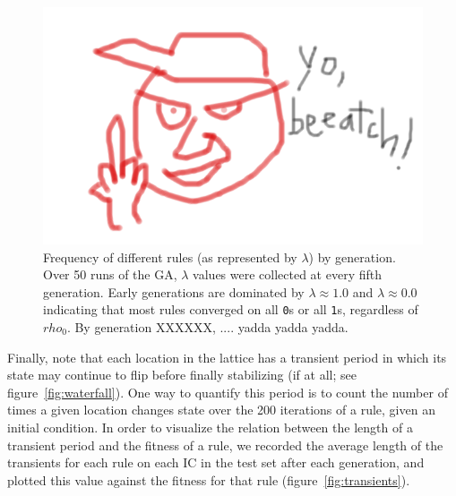 \begin{figure}
\begin{center}
\includegraphics[width=\linewidth]{foo.png}
\caption{Frequency of different rules (as represented by $\lambda$) by generation. Over 50 runs of the GA, $\lambda$ values were collected at every 
fifth generation. Early generations are dominated by $\lambda \approx 1.0$ and $\lambda \approx 0.0$ indicating that most rules converged on all 
\texttt{0}s or all \texttt{1}s, regardless of $rho_0$. By generation XXXXXX, .... yadda yadda yadda.}
\label{fig:histogram}
\end{center}
\end{figure}

Finally, note that each location in the lattice has a transient period in which its state may continue to flip before finally stabilizing (if at all; see figure~\ref{fig:waterfall}). One way to quantify this period is to count the number of times a given location changes state 
over the 200 iterations of a rule, given an initial condition. In order to visualize the relation between the length of a transient period and the fitness of a rule, 
we recorded the average length of the transients for each rule on each IC in the test set after each generation, and plotted this value against the fitness 
for that rule (figure~\ref{fig:transients}).

